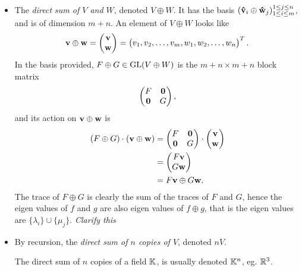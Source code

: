 		\begin{itemize}
			\item The \emph{direct sum of $V$ and $W$}, denoted $V \oplus W$.
				\subitem It has the basis $(\mathbf{\hat{v}}_i \oplus \mathbf{\hat{w}}_j)_{1 \leq i \leq m}^{1 \leq j \leq n}$, and is of dimension $m+n$.
				\subitem An element of $V \oplus W$ looks like \begin{align*}
					\mathbf{v} \oplus \mathbf{w} = \begin{pmatrix}
						\mathbf{v} \\ \mathbf{w}
					\end{pmatrix} = \begin{pmatrix}
					v_1, v_2, \dots, v_m, w_1, w_2, \dots, w_n
					\end{pmatrix}^T.
				\end{align*}
				\subitem In the basis provided, $F \oplus G \in \text{GL}(V \oplus W)$ is the $m+n \times m+n$ block matrix 
				\begin{align*}
					\begin{pmatrix}
						F & \mathbf{0} \\ 
						\mathbf{0} & G
					\end{pmatrix},
				\end{align*}
				and its action on $\mathbf{v} \oplus \mathbf{w}$ is 
				\begin{align*}
					(F \oplus G ) \cdot (\mathbf{v}  \oplus \mathbf{w}) &= \begin{pmatrix}
						F & \mathbf{0} \\ 
						\mathbf{0} & G
					\end{pmatrix} \cdot \begin{pmatrix}
					\mathbf{v} \\ \mathbf{w}
					\end{pmatrix} \\ 
					&= \begin{pmatrix}
					F\mathbf{v} \\ G\mathbf{w}
					\end{pmatrix}  \\ 
					&= F\mathbf{v} \oplus G\mathbf{w}.
				\end{align*}
				\subitem The trace of $F \oplus G$ is clearly the sum of the traces of $F$ and $G$, hence the eigen values of $f$ and $g$ are also eigen values of $f \oplus g$, that is the eigen values are $\{\lambda_i\} \cup \{\mu_j\}$. \textit{Clarify this}
				
			\item By recursion, the \emph{direct sum of $n$ copies of $V$}, denoted $nV$.
				\begin{example}
					The direct sum of $n$ copies of a field $\mathbb{K}$, is usually denoted $\mathbb{K}^n$, eg. $\mathbb{R}^3$.
				\end{example}
				

\end{itemize}
